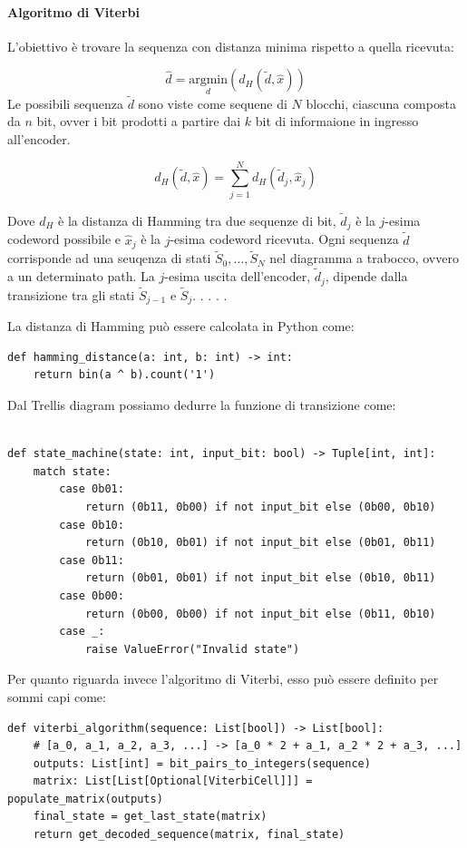\paragraph*{Algoritmo di Viterbi}
L'obiettivo è trovare la sequenza con distanza minima rispetto a quella ricevuta:

\[
    \hat{d} = \underset{d}{\text{argmin}} \left( d_H \left(\tilde{d}, \hat{x}\right) \right)
\]
Le possibili sequenza $\tilde{d}$ sono viste come sequene di $N$ blocchi, ciascuna composta da 
$n$ bit, ovver i bit prodotti a partire dai $k$ bit di informaione in ingresso all'encoder.


\[
    d_H\left(\tilde{d}, \hat{x}\right) = \sum_{j=1}^{N} d_H\left(\tilde{d}_j, \hat{x}_j\right)
\]

Dove $d_H$ è la distanza di Hamming tra due sequenze di bit, $\tilde{d}_j$ è la $j$-esima codeword possibile e $\hat{x}_j$ è la $j$-esima codeword ricevuta.
Ogni sequenza $\tilde{d}$ corrisponde ad una seuqenza di stati $\tilde{S}_0, \ldots, \tilde{S}_N$ nel diagramma a trabocco, ovvero a un determinato path. La $j$-esima uscita dell'encoder, $\tilde{d}_j$, dipende dalla transizione tra gli stati $\tilde{S}_{j-1}$ e $\tilde{S}_j$.
.
.
.
.

La distanza di Hamming può essere calcolata in Python come:
\begin{verbatim}
def hamming_distance(a: int, b: int) -> int:
    return bin(a ^ b).count('1')
\end{verbatim}


Dal Trellis diagram possiamo dedurre la funzione di transizione come:
\begin{verbatim}

def state_machine(state: int, input_bit: bool) -> Tuple[int, int]:
    match state:
        case 0b01:
            return (0b11, 0b00) if not input_bit else (0b00, 0b10)
        case 0b10:
            return (0b10, 0b01) if not input_bit else (0b01, 0b11)
        case 0b11:
            return (0b01, 0b01) if not input_bit else (0b10, 0b11)
        case 0b00:
            return (0b00, 0b00) if not input_bit else (0b11, 0b10)
        case _:
            raise ValueError("Invalid state")

\end{verbatim}
Per quanto riguarda invece l'algoritmo di Viterbi, esso può essere definito per sommi capi come:

\begin{verbatim}
def viterbi_algorithm(sequence: List[bool]) -> List[bool]:
    # [a_0, a_1, a_2, a_3, ...] -> [a_0 * 2 + a_1, a_2 * 2 + a_3, ...]
    outputs: List[int] = bit_pairs_to_integers(sequence)
    matrix: List[List[Optional[ViterbiCell]]] = populate_matrix(outputs)
    final_state = get_last_state(matrix)
    return get_decoded_sequence(matrix, final_state)
\end{verbatim}

